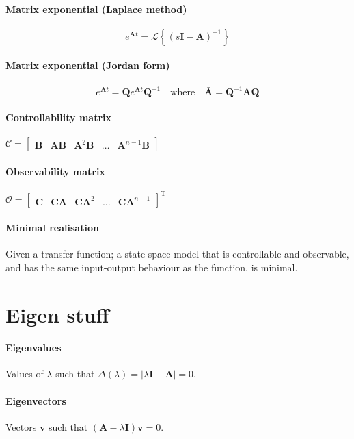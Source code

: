 \documentclass[a4paper]{article}
\newcommand{\M}[1]{\bm{#1}}
\newcommand{\Mc}[1]{\mathbf{#1}}
\newcommand{\V}[1]{\mathbf{#1}}
\newcommand{\lagrange}{\mathscr{L}}
\begin{document}
\paragraph{Matrix exponential (Laplace method)}
$$e^{\M{A}t} = \lagrange \left\{ (s\Mc{I}-\M{A})^{-1} \right\}$$

\paragraph{Matrix exponential (Jordan form)}
$$e^{\M{A}t} = \M{Q} e^{\bar{\M{A}}t} \M{Q}^{-1} \quad \text{where} \quad \bar{\M{A}} = \M{Q}^{-1}\M{AQ}$$

\paragraph{Controllability matrix}
$\mathcal{C} = \begin{bmatrix}\M{B} & \M{AB} & \M{A}^{2}\M{B} & \hdots & \M{A}^{n-1}\M{B}\end{bmatrix}$

\paragraph{Observability matrix}
$\mathcal{O} = \begin{bmatrix}\M{C} & \M{CA} & \M{CA}^2 & \hdots & \M{CA}^{n-1}\end{bmatrix}^{\text{T}}$

\paragraph{Minimal realisation}
Given a transfer function; a state-space model that is controllable and observable, and has the same input-output behaviour as the function, is minimal.



\section{Eigen stuff}
\paragraph{Eigenvalues} Values of $\lambda$ such that $\Delta(\lambda) = |\lambda \M{I} - \M{A}| = 0$.
\paragraph{Eigenvectors} Vectors $\V{v}$ such that $(\M{A} - \lambda \Mc{I})\V{v} = 0$.
\end{document}
